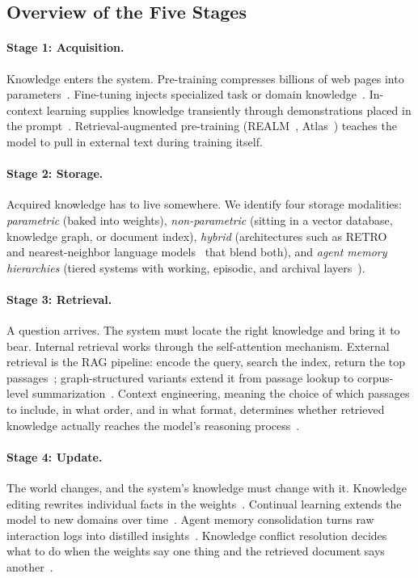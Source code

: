 \documentclass{article}
\begin{document}
\subsection{Overview of the Five Stages}

\paragraph{Stage 1: Acquisition.} Knowledge enters the system. Pre-training compresses billions of web pages into parameters~\citep{kaplan2020scaling, hoffmann2022chinchilla}. Fine-tuning injects specialized task or domain knowledge~\citep{hu2022lora}. In-context learning supplies knowledge transiently through demonstrations placed in the prompt~\citep{min2022rethinking}. Retrieval-augmented pre-training (REALM~\citep{guu2020realm}, Atlas~\citep{izacard2023atlas}) teaches the model to pull in external text during training itself.

\paragraph{Stage 2: Storage.} Acquired knowledge has to live somewhere. We identify four storage modalities: \textit{parametric} (baked into weights), \textit{non-parametric} (sitting in a vector database, knowledge graph, or document index), \textit{hybrid} (architectures such as RETRO~\citep{borgeaud2022retro} and nearest-neighbor language models~\citep{khandelwal2020knnlm} that blend both), and \textit{agent memory hierarchies} (tiered systems with working, episodic, and archival layers~\citep{packer2023memgpt}).

\paragraph{Stage 3: Retrieval.} A question arrives. The system must locate the right knowledge and bring it to bear. Internal retrieval works through the self-attention mechanism. External retrieval is the RAG pipeline: encode the query, search the index, return the top passages~\citep{karpukhin2020dpr}; graph-structured variants extend it from passage lookup to corpus-level summarization~\citep{edge2024graphrag}. Context engineering, meaning the choice of which passages to include, in what order, and in what format, determines whether retrieved knowledge actually reaches the model's reasoning process~\citep{liu2024lost}.

\paragraph{Stage 4: Update.} The world changes, and the system's knowledge must change with it. Knowledge editing rewrites individual facts in the weights~\citep{meng2022rome, meng2023memit}. Continual learning extends the model to new domains over time~\citep{kirkpatrick2017ewc}. Agent memory consolidation turns raw interaction logs into distilled insights~\citep{park2023generative}. Knowledge conflict resolution decides what to do when the weights say one thing and the retrieved document says another~\citep{xie2024conflicts, longpre2021entity}.
\end{document}
